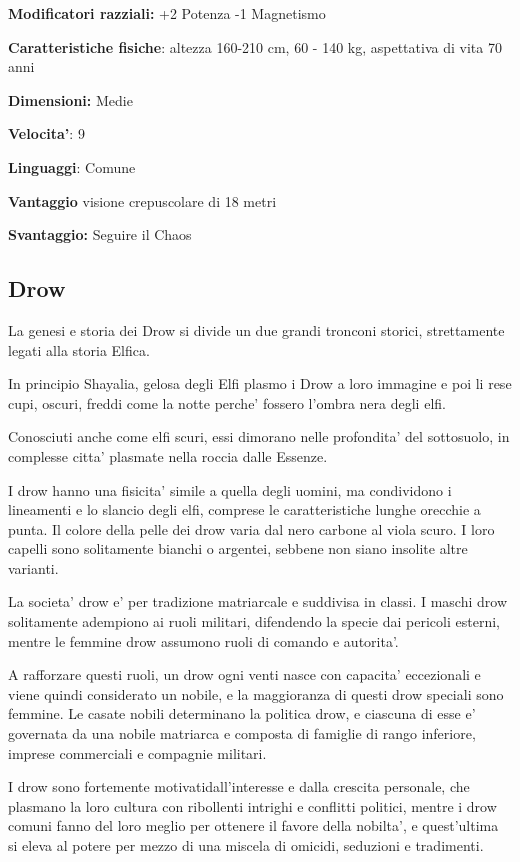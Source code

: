 \documentclass[a4paper,11pt,twoside,openany]{dndbook}
\begin{document}
\textbf{Modificatori razziali:} +2 Potenza -1 Magnetismo

\textbf{Caratteristiche fisiche}: altezza 160-210 cm, 60 - 140 kg,
aspettativa di vita 70 anni

\textbf{Dimensioni:} Medie

\textbf{Velocita'}: 9

\textbf{Linguaggi}: Comune

\textbf{Vantaggio} visione crepuscolare di 18 metri

\textbf{Svantaggio:} Seguire il Chaos

\subsection{Drow}

\label{drow}

La genesi e storia dei Drow si divide un due grandi tronconi storici, strettamente legati alla storia Elfica.

In principio Shayalia, gelosa degli Elfi plasmo i Drow a loro immagine e poi li rese cupi, oscuri, freddi come la notte perche' fossero l'ombra nera degli elfi.

Conosciuti anche come elfi scuri, essi dimorano nelle profondita' del sottosuolo, in complesse citta' plasmate nella roccia dalle Essenze.

I drow hanno una fisicita' simile a quella degli uomini, ma condividono i lineamenti e lo slancio degli elfi, comprese le caratteristiche lunghe orecchie a punta. Il colore della pelle dei drow varia dal nero carbone al viola scuro. I loro capelli sono solitamente bianchi o argentei, sebbene non siano insolite altre varianti.

La societa' drow e' per tradizione matriarcale e suddivisa in classi. I maschi drow solitamente adempiono ai ruoli militari, difendendo la specie dai pericoli esterni, mentre le femmine drow assumono ruoli di comando e autorita'.

A rafforzare questi ruoli, un drow ogni venti nasce con capacita' eccezionali e viene quindi considerato un nobile, e la maggioranza di questi drow speciali sono femmine. Le casate nobili determinano la politica drow, e ciascuna di esse e' governata da una nobile matriarca e composta di famiglie di rango inferiore, imprese commerciali e compagnie militari.

I drow sono fortemente motivatidall'interesse e dalla crescita personale, che plasmano la loro cultura con ribollenti intrighi e conflitti politici, mentre i drow comuni fanno del loro meglio per ottenere il favore della nobilta', e quest'ultima si eleva al potere per mezzo di una miscela di omicidi, seduzioni e tradimenti.
\end{document}
